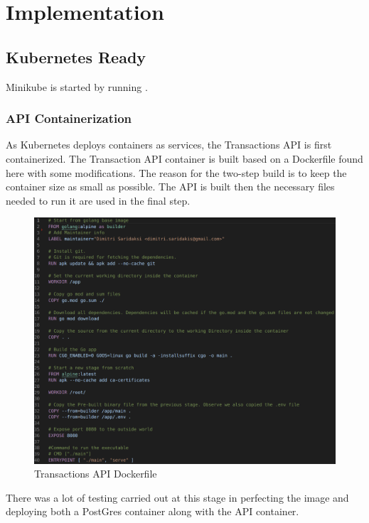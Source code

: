 \chapter{Implementation}
\label{chap:2}

\section{Kubernetes Ready}
\begin{flushleft}
    Minikube is started by running .\newline
    \subsection{API Containerization}
    As Kubernetes deploys containers as services, the Transactions API is first containerized.\newline
    The Transaction API container is built based on a Dockerfile found here \autocite{stevenDeployingDockerizedGolang2019} with some modifications. The reason for the
    two-step build is to keep the container size as small as possible. The API is built then the necessary files needed to run it are used in the final step.
    \begin{figure} [ht]
        \begin{center}
            \includegraphics[width=.8\textwidth]{figures/apidockerfile.png}
            \caption{Transactions API Dockerfile}
            \label{fig: 2.1}
        \end{center}
    \end{figure}
    \pagebreak
    \newline There was a lot of testing carried out at this stage in perfecting the image and deploying both a PostGres container along with the API container.

\end{flushleft}
